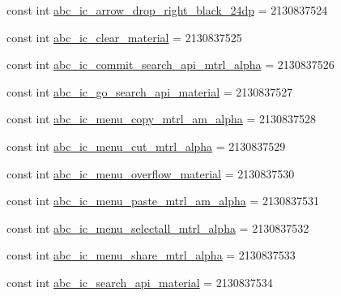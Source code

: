 \begin{DoxyCompactItemize}
\item 
const int \mbox{\hyperlink{class_f_w_p_s___app_1_1_droid_1_1_resource_1_1_drawable_a83855726c25d79f85e2c396844b48f32}{abc\+\_\+ic\+\_\+arrow\+\_\+drop\+\_\+right\+\_\+black\+\_\+24dp}} = 2130837524
\item 
const int \mbox{\hyperlink{class_f_w_p_s___app_1_1_droid_1_1_resource_1_1_drawable_a94df19dfc9156c4322d4e64e3da2aea8}{abc\+\_\+ic\+\_\+clear\+\_\+material}} = 2130837525
\item 
const int \mbox{\hyperlink{class_f_w_p_s___app_1_1_droid_1_1_resource_1_1_drawable_a1011e4e0c179f9745fc0f4ef9f093e97}{abc\+\_\+ic\+\_\+commit\+\_\+search\+\_\+api\+\_\+mtrl\+\_\+alpha}} = 2130837526
\item 
const int \mbox{\hyperlink{class_f_w_p_s___app_1_1_droid_1_1_resource_1_1_drawable_a5362af2f0a5decb7fc8a449db68c27ee}{abc\+\_\+ic\+\_\+go\+\_\+search\+\_\+api\+\_\+material}} = 2130837527
\item 
const int \mbox{\hyperlink{class_f_w_p_s___app_1_1_droid_1_1_resource_1_1_drawable_a59b94a2d59864ed19447a547681d55ff}{abc\+\_\+ic\+\_\+menu\+\_\+copy\+\_\+mtrl\+\_\+am\+\_\+alpha}} = 2130837528
\item 
const int \mbox{\hyperlink{class_f_w_p_s___app_1_1_droid_1_1_resource_1_1_drawable_aba9b967f4049a6683dcfaeff7c0eff3c}{abc\+\_\+ic\+\_\+menu\+\_\+cut\+\_\+mtrl\+\_\+alpha}} = 2130837529
\item 
const int \mbox{\hyperlink{class_f_w_p_s___app_1_1_droid_1_1_resource_1_1_drawable_a6389daa8ef64c1bb05c3f38e9e72f300}{abc\+\_\+ic\+\_\+menu\+\_\+overflow\+\_\+material}} = 2130837530
\item 
const int \mbox{\hyperlink{class_f_w_p_s___app_1_1_droid_1_1_resource_1_1_drawable_a098245deee87d684742ab3a39a7a9470}{abc\+\_\+ic\+\_\+menu\+\_\+paste\+\_\+mtrl\+\_\+am\+\_\+alpha}} = 2130837531
\item 
const int \mbox{\hyperlink{class_f_w_p_s___app_1_1_droid_1_1_resource_1_1_drawable_a0e5438bb3f2f845b41788cddd22dee48}{abc\+\_\+ic\+\_\+menu\+\_\+selectall\+\_\+mtrl\+\_\+alpha}} = 2130837532
\item 
const int \mbox{\hyperlink{class_f_w_p_s___app_1_1_droid_1_1_resource_1_1_drawable_ade6cf53c99a725e355a2e263c977677b}{abc\+\_\+ic\+\_\+menu\+\_\+share\+\_\+mtrl\+\_\+alpha}} = 2130837533
\item 
const int \mbox{\hyperlink{class_f_w_p_s___app_1_1_droid_1_1_resource_1_1_drawable_afe83ee9bc842abb90028d05f2a00e382}{abc\+\_\+ic\+\_\+search\+\_\+api\+\_\+material}} = 2130837534
\item 

\end{DoxyCompactItemize}
